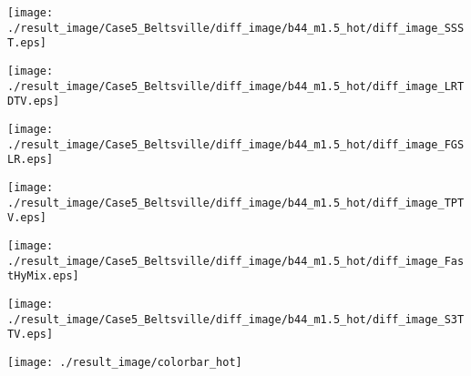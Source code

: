 \begin{figure*}[t]
\begin{center}
		\begin{minipage}{0.125\hsize}
			\centerline{\hspace{\hsize}} %
		\end{minipage}
		\begin{minipage}{0.125\hsize}
			\centerline{\texttt{[image: ./result\_image/Case5\_Beltsville/diff\_image/b44\_m1.5\_hot/diff\_image\_SSST.eps]}} %
		\end{minipage}
		\begin{minipage}{0.125\hsize}
			\centerline{\texttt{[image: ./result\_image/Case5\_Beltsville/diff\_image/b44\_m1.5\_hot/diff\_image\_LRTDTV.eps]}} %
		\end{minipage}
		\begin{minipage}{0.125\hsize}
			\centerline{\texttt{[image: ./result\_image/Case5\_Beltsville/diff\_image/b44\_m1.5\_hot/diff\_image\_FGSLR.eps]}} %
		\end{minipage}
		\begin{minipage}{0.125\hsize}
			\centerline{\texttt{[image: ./result\_image/Case5\_Beltsville/diff\_image/b44\_m1.5\_hot/diff\_image\_TPTV.eps]}} %
		\end{minipage}
		\begin{minipage}{0.125\hsize}
			\centerline{\texttt{[image: ./result\_image/Case5\_Beltsville/diff\_image/b44\_m1.5\_hot/diff\_image\_FastHyMix.eps]}} %
		\end{minipage}
		\begin{minipage}{0.125\hsize}
			\centerline{\texttt{[image: ./result\_image/Case5\_Beltsville/diff\_image/b44\_m1.5\_hot/diff\_image\_S3TTV.eps]}} %
		\end{minipage}
		\begin{minipage}{0.050\hsize}
			\centerline{\texttt{[image: ./result\_image/colorbar\_hot]}} %
		\end{minipage}
		
		\vspace{1mm}
		

\end{center}
\end{figure*}
